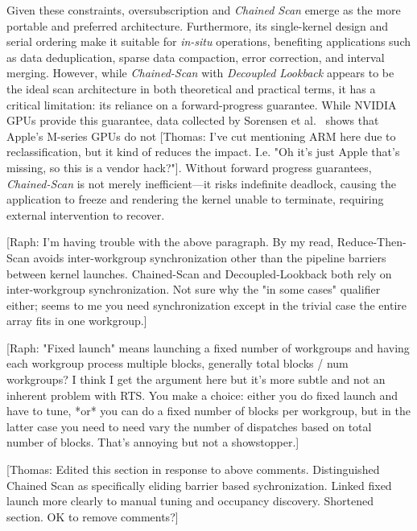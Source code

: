 \documentclass[sigconf]{acmart}
\newcommand{\thomas}[1]{{\footnotesize\color{orange}[Thomas: #1]}}
\newcommand{\raph}[1]{{\footnotesize\color{magenta}[Raph: #1]}}
\begin{document}
Given these constraints, oversubscription and \emph{Chained Scan} emerge as the more portable and preferred architecture. Furthermore, its single-kernel design and serial ordering make it suitable for \emph{in-situ} operations, benefiting applications such as data deduplication, sparse data compaction, error correction, and interval merging. However, while \emph{Chained-Scan} with \emph{Decoupled Lookback} appears to be the ideal scan architecture in both theoretical and practical terms, it has a critical limitation: its reliance on a forward-progress guarantee. While NVIDIA GPUs provide this guarantee, data collected by Sorensen et al.~\cite{sorensen2021} shows that Apple’s M-series GPUs do not \thomas{I've cut mentioning ARM here due to reclassification, but it kind of reduces the impact. I.e. "Oh it's just Apple that's missing, so this is a vendor hack?"}. Without forward progress guarantees, \emph{Chained-Scan} is not merely inefficient---it risks indefinite deadlock, causing the application to freeze and rendering the kernel unable to terminate, requiring external intervention to recover.

\raph{I'm having trouble with the above paragraph. By my read, Reduce-Then-Scan avoids inter-workgroup synchronization other than the pipeline barriers between kernel launches. Chained-Scan and Decoupled-Lookback both rely on inter-workgroup synchronization. Not sure why the "in some cases" qualifier either; seems to me you need synchronization except in the trivial case the entire array fits in one workgroup.}

\raph{"Fixed launch" means launching a fixed number of workgroups and having each workgroup process multiple blocks, generally total blocks / num workgroups? I think I get the argument here but it's more subtle and not an inherent problem with RTS. You make a choice: either you do fixed launch and have to tune, *or* you can do a fixed number of blocks per workgroup, but in the latter case you need to need vary the number of dispatches based on total number of blocks. That's annoying but not a showstopper.}

\thomas{Edited this section in response to above comments. Distinguished Chained Scan as specifically eliding barrier based sychronization. Linked fixed launch more clearly to manual tuning and occupancy discovery. Shortened section. OK to remove comments?}
\end{document}
